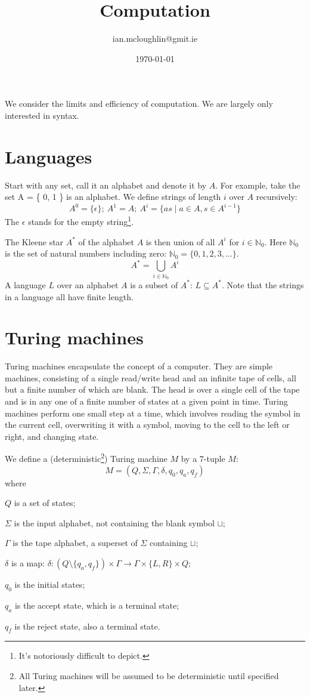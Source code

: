 \documentclass{iansnotes}
\title{Computation}
\author{ian.mcloughlin@gmit.ie}
\date{\today}
\begin{document}
\maketitle
  We consider the limits and efficiency of computation.
  We are largely only interested in syntax.

\section{Languages}
  Start with any set, call it an alphabet and denote it by \( A \).
  For example, take the set A = \{ 0, 1 \} is an alphabet.
  We define strings of length \( i \) over \( A \) recursively:
  \[
    A^0 = \{ \epsilon \}; \ 
    A^1 = A; \ 
    A^{i} = \{ as \mid a \in A, s \in A^{i-1} \}
  \]
  The \( \epsilon \) stands for the empty string\footnote{It's notoriously difficult to depict.}.

  The Kleene star \( A^* \) of the alphabet \( A \) is then union of all \( A^i \) for \( i \in \mathbb{N}_0 \).
  Here \( \mathbb{N}_0 \) is the set of natural numbers including zero: \( \mathbb{N}_0 = \{ 0, 1, 2, 3, \ldots \} \).
  \[ A^* = \bigcup_{i \in \mathbb{N}_0} A^i\]
  A language \( L \) over an alphabet \( A \) is a subset of \( A^* \): \( L \subseteq A^* \).
  Note that the strings in a language all have finite length.

\section{Turing machines}
  Turing machines encapsulate the concept of a computer.
  They are simple machines, consisting of a single read/write head and an infinite tape of cells, all but a finite number of which are blank.  
  The head is over a single cell of the tape and is in any one of a finite number of states at a given point in time.
  Turing machines perform one small step at a time, which involves reading the symbol in the current cell, overwriting it with a symbol, moving to the cell to the left or right, and changing state.

  We define a (deterministic\footnote{All Turing machines will be assumed to be deterministic until specified later.}) Turing machine \( M \) by a 7-tuple $M$:
  \[ M = ( Q, \Sigma, \Gamma, \delta, q_0, q_a, q_f ) \]
  where
\begin{description}
  \item $Q$ is a set of states;
  \item $\Sigma$ is the input alphabet, not containing the blank symbol \( \sqcup \);
  \item $\Gamma$ is the tape alphabet, a superset of \( \Sigma \) containing \( \sqcup \);
  \item $\delta$ is a map: $\delta: (Q \setminus \{ q_a, q_f \}) \times \Gamma \rightarrow \Gamma \times \{ L, R \} \times Q;$
  \item $q_0$ is the initial states;
  \item $q_a$ is the accept state, which is a terminal state;
  \item $q_f$ is the reject state, also a terminal state.  
\end{description}
\end{document}
